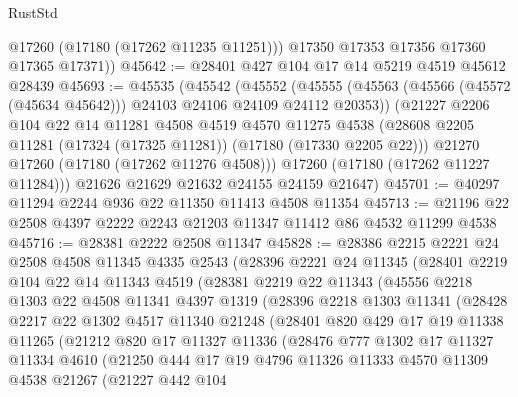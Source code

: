 \begin{lexlean}{RustStd}
\begin{coremodule}
{\begin{coremodule}
{{{{{{{{{{{{{{{{{{{{{{{{{{{{{{{{{{{{{{{{{{{{{{{{{{{{{{{          @17260
          (@17180 (@17262 @11235 @11251)))
        @17350
        @17353
        @17356
        @17360
        @17365
        @17371))
@45642 := @28401 @427 @104 @17 @14 @5219 @4519 @45612 @28439
@45693 := @45535
    (@45542
      (@45552
        (@45555 (@45563 (@45566 (@45572 (@45634 @45642))) @24103 @24106 @24109 @24112 @20353))
        (@21227
          @2206
          @104
          @22
          @14
          @11281
          @4508
          @4519
          @4570
          @11275
          @4538
          (@28608 @2205 @11281 (@17324 (@17325 @11281)) (@17180 (@17330 @2205 @22)))
          @21270
          @17260
          (@17180 (@17262 @11276 @4508)))
        @17260
        (@17180 (@17262 @11227 @11284)))
      @21626
      @21629
      @21632
      @24155
      @24159
      @21647)
@45701 := @40297 @11294 @2244 @936 @22 @11350 @11413 @4508 @11354
@45713 := @21196 @22 @2508 @4397 @2222 @2243 @21203 @11347 @11412 @86 @4532 @11299 @4538
@45716 := @28381 @2222 @2508 @11347
@45828 := @28386
    @2215
    @2221
    @24
    @2508
    @4508
    @11345
    @4335
    @2543
    (@28396
      @2221
      @24
      @11345
      (@28401
        @2219
        @104
        @22
        @14
        @11343
        @4519
        (@28381
          @2219
          @22
          @11343
          (@45556
            @2218
            @1303
            @22
            @4508
            @11341
            @4397
            @1319
            (@28396
              @2218
              @1303
              @11341
              (@28428
                @2217
                @22
                @1302
                @4517
                @11340
                @21248
                (@28401
                  @820
                  @429
                  @17
                  @19
                  @11338
                  @11265
                  (@21212
                    @820
                    @17
                    @11327
                    @11336
                    (@28476
                      @777
                      @1302
                      @17
                      @11327
                      @11334
                      @4610
                      (@21250
                        @444
                        @17
                        @19
                        @4796
                        @11326
                        @11333
                        @4570
                        @11309
                        @4538
                        @21267
                        (@21227
                          @442
                          @104
}}}}}}}}}}}}}}}}}}}}}}}}}}}}}}}}}}}}}}}}}}}}}}}}}}}}}}}
\end{coremodule}}
\end{coremodule}
\end{lexlean}
